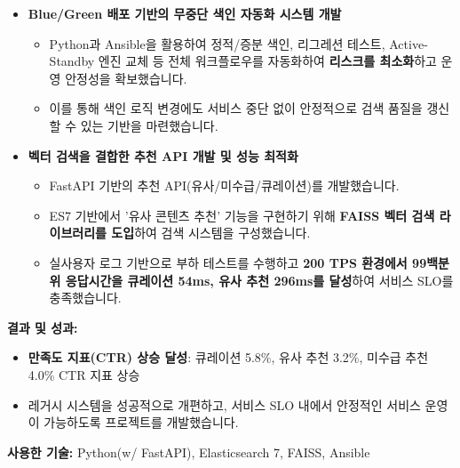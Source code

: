 \documentclass[letterpaper,11pt]{article}
\begin{document}
{{\begin{itemize}[leftmargin=*]
              \item \textbf{Blue/Green 배포 기반의 무중단 색인 자동화 시스템 개발}
                  \begin{itemize}[leftmargin=*, label=$\circ$]
                      \item Python과 Ansible을 활용하여 정적/증분 색인, 리그레션 테스트, Active-Standby 엔진 교체 등 전체 워크플로우를 자동화하여 \textbf{리스크를 최소화}하고 운영 안정성을 확보했습니다.
                      \item 이를 통해 색인 로직 변경에도 서비스 중단 없이 안정적으로 검색 품질을 갱신할 수 있는 기반을 마련했습니다.
                  \end{itemize}
                  
              \item \textbf{벡터 검색을 결합한 추천 API 개발 및 성능 최적화}
                  \begin{itemize}[leftmargin=*, label=$\circ$]
                      \item FastAPI 기반의 추천 API(유사/미수급/큐레이션)를 개발했습니다.
                      \item ES7 기반에서  '유사 콘텐츠 추천' 기능을 구현하기 위해 \textbf{FAISS 벡터 검색 라이브러리를 도입}하여 검색 시스템을 구성했습니다.
                      \item 실사용자 로그 기반으로 부하 테스트를 수행하고 \textbf{200 TPS 환경에서 99백분위 응답시간을 큐레이션 54ms, 유사 추천 296ms를 달성}하여 서비스 SLO를 충족했습니다.
                  \end{itemize}
          \end{itemize}

          \textbf{결과 및 성과:}
          \begin{itemize}[leftmargin=*]
              \item \textbf{만족도 지표(CTR) 상승 달성}: 큐레이션 5.8\%, 유사 추천 3.2\%, 미수급 추천 4.0\% CTR 지표 상승
              \item 레거시 시스템을 성공적으로 개편하고, 서비스 SLO 내에서 안정적인 서비스 운영이 가능하도록 프로젝트를 개발했습니다.
          \end{itemize}

          \textbf{사용한 기술:} Python(w/ FastAPI), Elasticsearch 7, FAISS, Ansible

        }
      \resumeSubProjectListEnd
    }

  \resumeProjectListEnd
\end{document}
